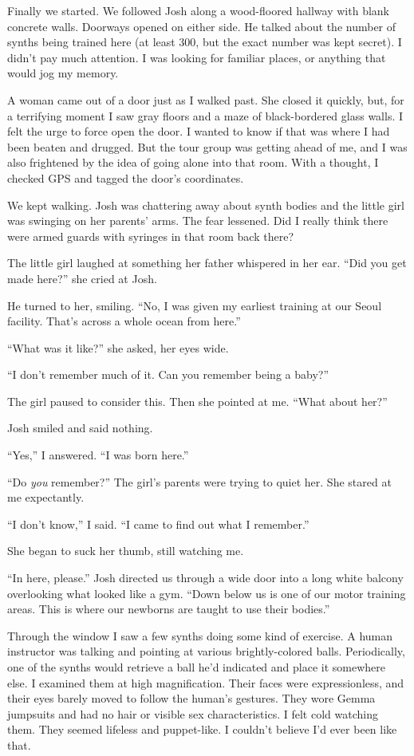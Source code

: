 \documentclass[10pt,b5paper]{article}
\begin{document}
Finally we started. We followed Josh along a wood-floored hallway with
blank concrete walls.  Doorways opened on either side. He talked about
the number of synths being trained here (at least 300, but the exact
number was kept secret). I didn't pay much attention. I was looking
for familiar places, or anything that would jog my memory.

A woman came out of a door just as I walked past. She closed
it quickly, but, for a terrifying moment I saw gray floors and a
maze of black-bordered glass walls.  I felt the urge to force open
the door. I wanted to know if that was where I had been beaten and
drugged. But the tour group was getting ahead of me, and I was also
frightened by the idea of going alone into that room. With a thought,
I checked GPS and tagged the door's coordinates.

We kept walking. Josh was chattering away about synth bodies and the
little girl was swinging on her parents' arms. The fear lessened. Did
I really think there were armed guards with syringes in that room
back there?

The little girl laughed at something her father whispered in her ear.
``Did you get made here?'' she cried at Josh.

He turned to her, smiling. ``No, I was given my earliest training at
our Seoul facility. That's across a whole ocean from here.''

``What was it like?'' she asked, her eyes wide.

``I don't remember much of it. Can you remember being a baby?''

The girl paused to consider this. Then she pointed at me. ``What
about her?''

Josh smiled and said nothing.

``Yes,'' I answered. ``I was born here.''

``Do \emph{you} remember?'' The girl's parents were trying to quiet
her. She stared at me expectantly.

``I don't know,'' I said. ``I came to find out what I remember.''

She began to suck her thumb, still watching me.

``In here, please.'' Josh directed us through a wide door into a long
white balcony overlooking what looked like a gym.  ``Down below us
is one of our motor training areas. This is where our newborns are
taught to use their bodies.''

Through the window I saw a few synths doing some kind of exercise. A
human instructor was talking and pointing at various brightly-colored
balls.  Periodically, one of the synths would retrieve a ball
he'd indicated and place it somewhere else. I examined them at high
magnification. Their faces were expressionless, and their eyes barely
moved to follow the human's gestures. They wore Gemma jumpsuits and
had no hair or visible sex characteristics. I felt cold watching
them. They seemed lifeless and puppet-like. I couldn't believe I'd
ever been like that.
\end{document}
